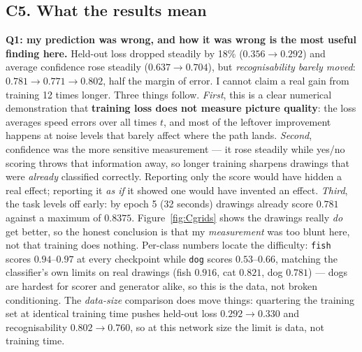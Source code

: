 \documentclass[12pt,a4paper]{article}
\begin{document}
\subsection{C5. What the results mean}

\textbf{Q1: my prediction was wrong, and how it was wrong is the most useful finding here.} Held-out loss
dropped steadily by 18\% ($0.356\to0.292$) and average confidence rose steadily ($0.637\to0.704$), but
\emph{recognisability barely moved}: $0.781\to0.771\to0.802$, half the margin of error. I cannot claim a real
gain from training 12 times longer. Three things follow. \emph{First}, this is a clear numerical demonstration
that \textbf{training loss does not measure picture quality}: the loss averages speed errors over all times
$t$, and most of the leftover improvement happens at noise levels that barely affect where the path lands.
\emph{Second}, confidence was the more sensitive measurement --- it rose steadily while yes/no scoring throws
that information away, so longer training sharpens drawings that were \emph{already} classified correctly.
Reporting only the score would have hidden a real effect; reporting it \emph{as if} it showed one would have
invented an effect. \emph{Third}, the task levels off early: by epoch 5 (32 seconds) drawings already score
$0.781$ against a maximum of $0.8375$. Figure~\ref{fig:Cgrids} shows the drawings really \emph{do} get better,
so the honest conclusion is that my \emph{measurement} was too blunt here, not that training does nothing.
Per-class numbers locate the difficulty: \texttt{fish} scores $0.94$--$0.97$ at every checkpoint while
\texttt{dog} scores $0.53$--$0.66$, matching the classifier's own limits on real drawings (fish $0.916$, cat
$0.821$, dog $0.781$) --- dogs are hardest for scorer and generator alike, so this is the data, not broken
conditioning. The \emph{data-size} comparison does move things: quartering the training set at identical
training time pushes held-out loss $0.292\to0.330$ and recognisability $0.802\to0.760$, so at this network
size the limit is data, not training time.
\end{document}
